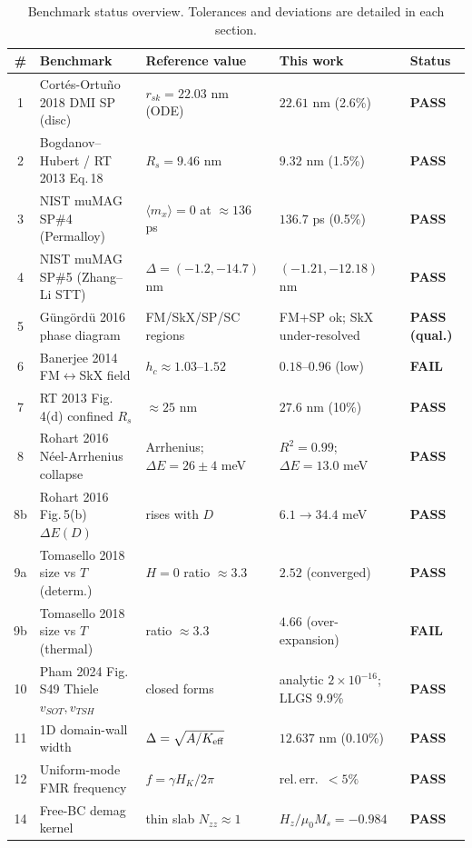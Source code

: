 \documentclass[11pt]{article}
\newcommand{\PASS}{\textcolor{green!55!black}{\textbf{PASS}}}
\newcommand{\FAIL}{\textcolor{red!75!black}{\textbf{FAIL}}}
\newcommand{\QUAL}{\textcolor{orange!85!black}{\textbf{PASS (qual.)}}}
\begin{document}
\begin{table}[htbp]
\centering
\caption{Benchmark status overview. Tolerances and deviations are
detailed in each section.}
\footnotesize
\setlength{\tabcolsep}{3.5pt}
\renewcommand{\arraystretch}{1.2}
\begin{tabular}{@{}c
  >{\raggedright\arraybackslash}p{3.8cm}
  >{\raggedright\arraybackslash}p{3.9cm}
  >{\raggedright\arraybackslash}p{3.5cm}
  >{\centering\arraybackslash}p{1.6cm}@{}}
\toprule
\# & Benchmark & Reference value & This work & Status \\
\midrule
1  & Cort\'es-Ortu\~no 2018 DMI SP (disc) & $r_{sk}=22.03$ nm (ODE)
   & $22.61$ nm (2.6\%) & \PASS \\
2  & Bogdanov--Hubert / RT 2013 Eq.\,18 & $R_s=9.46$ nm
   & $9.32$ nm (1.5\%) & \PASS \\
3  & NIST muMAG SP\#4 (Permalloy) & $\langle m_x\rangle{=}0$ at
   ${\approx}136$ ps & $136.7$ ps (0.5\%) & \PASS \\
4  & NIST muMAG SP\#5 (Zhang--Li STT) & $\Delta{=}(-1.2,-14.7)$ nm
   & $(-1.21,-12.18)$ nm & \PASS \\
5  & G\"ung\"ord\"u 2016 phase diagram & FM/SkX/SP/SC regions
   & FM+SP ok; SkX under-resolved & \QUAL \\
6  & Banerjee 2014 FM$\leftrightarrow$SkX field & $h_c\approx
   1.03$--$1.52$ & $0.18$--$0.96$ (low) & \FAIL \\
7  & RT 2013 Fig.\,4(d) confined $R_s$ & ${\approx}25$ nm
   & $27.6$ nm (10\%) & \PASS \\
8  & Rohart 2016 N\'eel-Arrhenius collapse & Arrhenius;
   $\Delta E{=}26{\pm}4$ meV & $R^2{=}0.99$;
   $\Delta E{=}13.0$ meV & \PASS \\
8b & Rohart 2016 Fig.\,5(b) $\Delta E(D)$ & rises with $D$
   & $6.1\!\to\!34.4$ meV & \PASS \\
9a & Tomasello 2018 size vs $T$ (determ.) & $H{=}0$ ratio
   ${\approx}3.3$ & $2.52$ (converged) & \PASS \\
9b & Tomasello 2018 size vs $T$ (thermal) & ratio ${\approx}3.3$
   & $4.66$ (over-expansion) & \FAIL \\
10 & Pham 2024 Fig.\,S49 Thiele $v_{SOT},v_{TSH}$ & closed forms
   & analytic $2{\times}10^{-16}$; LLGS 9.9\% & \PASS \\
11 & 1D domain-wall width & $\Delta=\sqrt{A/K_{\rm eff}}$
   & $12.637$ nm (0.10\%) & \PASS \\
12 & Uniform-mode FMR frequency & $f=\gamma H_K/2\pi$
   & rel.\,err.\ ${<}5\%$ & \PASS \\
14 & Free-BC demag kernel & thin slab $N_{zz}\!\approx\!1$
   & $H_z/\mu_0 M_s=-0.984$ & \PASS \\
\bottomrule
\end{tabular}
\end{table}
\end{document}
